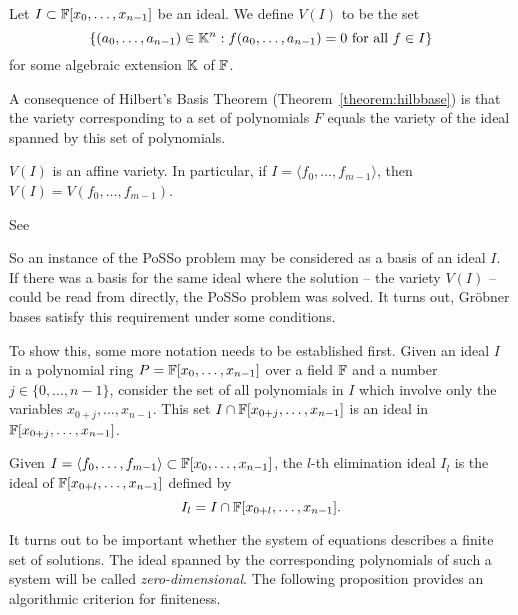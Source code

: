 \begin{definition} Let $I \subset \mathbb{F}[x_0,\dots,x_{n-1}]$ be an ideal. We define $V(I)$ to be the set
\[
 \{(a_0, \dots, a_{n-1}) \in \mathbb{K}^n : f(a_0,\dots, a_{n-1}) = 0 \textnormal{ for all } f \in I\}
\]
for some algebraic extension $\mathbb{K}$ of $\mathbb{F}$.
\end{definition}

A consequence of Hilbert's Basis Theorem (Theorem~\ref{theorem:hilbbase}) is that the variety corresponding to a set of polynomials $F$ equals the variety of the ideal spanned by this set of polynomials.

\begin{proposition}
$V(I)$ is an affine variety. In particular, if $I= \langle f_0, \dots, f_{m-1} \rangle$, then
$V(I) = V(f_0, \dots, f_{m-1})$.
\end{proposition}

\begin{citeproof}
See \cite[p.77]{Cox2005}
\end{citeproof}

So an instance of the PoSSo problem may be considered as a basis of an ideal $I$. If there was a basis for the same ideal where the solution -- the variety $V(I)$ -- could be read from directly, the PoSSo problem was solved. It turns out, Gröbner bases satisfy this requirement under some conditions.


To show this, some more notation needs to be established first. Given an ideal $I$ in a polynomial ring $P = \mathbb{F}[x_0 ,\dots , x_{n-1} ]$ over a field $\mathbb{F}$ and a number $j \in \{0,\dots , n-1\}$, consider the set of all polynomials in $I$ which involve only the variables $x_{0+j} ,\dots , x_{n-1}$. This set $I \cap \mathbb{F}[x_{0+j} , \dots , x_{n-1} ]$ is an ideal in $\mathbb{F}[x_{0+j},\dots,x_{n-1}]$.

\begin{definition}
Given $I = \langle f_0 ,\dots , f_{m-1} \rangle \subset \mathbb{F}[x_0 ,\dots , x_{n-1}]$, the $l$-th elimination
ideal $I_l$ is the ideal of $\mathbb{F}[x_{0+l} , \dots , x_{n-1}]$ defined by
\[ I_l = I \cap \mathbb{F}[x_{0+l} , \dots , x_{n-1} ]. \]
\label{def:elimination-ideal}
\end{definition}

It turns out to be important whether the system of equations describes a finite set of solutions. The ideal spanned by the corresponding polynomials of such a system will be called \emph{zero-dimensional}. The following proposition provides an algorithmic criterion for finiteness.

